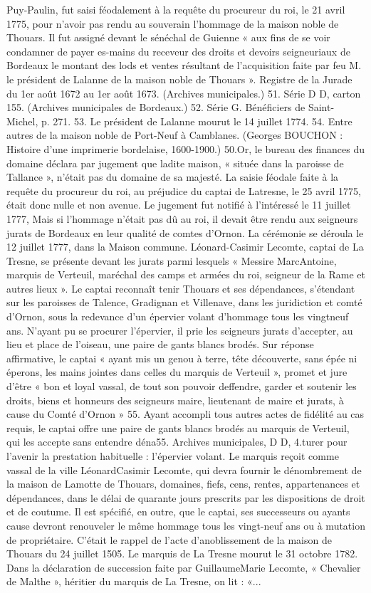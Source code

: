 Puy-Paulin, fut saisi féodalement à la requête du procureur du roi, le 21 avril 1775, pour n'avoir pas rendu au souverain l'hommage de la maison noble de Thouars. Il fut assigné devant le sénéchal de Guienne « aux fins de se voir condamner de payer es-mains du receveur des droits et devoirs seigneuriaux de Bordeaux le montant des lods et ventes résultant de l'acquisition faite par feu M. le président de Lalanne de la maison noble de Thouars ». Registre de la Jurade du 1er août 1672 au 1er août 1673. (Archives municipales.) 51. Série D D, carton 155. (Archives municipales de Bordeaux.) 52. Série G. Bénéficiers de Saint-Michel, p. 271. 53. Le président de Lalanne mourut le 14 juillet 1774. 54. Entre autres de la maison noble de Port-Neuf à Camblanes. (Georges BOUCHON : Histoire d'une imprimerie bordelaise, 1600-1900.) 50.Or, le bureau des finances du domaine déclara par jugement que ladite maison, « située dans la paroisse de Tallance », n'était pas du domaine de sa majesté. La saisie féodale faite à la requête du procureur du roi, au préjudice du captai de Latresne, le 25 avril 1775, était donc nulle et non avenue. Le jugement fut notifié à l'intéressé le 11 juillet 1777, Mais si l'hommage n'était pas dû au roi, il devait être rendu aux seigneurs jurats de Bordeaux en leur qualité de comtes d'Ornon. La cérémonie se déroula le 12 juillet 1777, dans la Maison commune. Léonard-Casimir Lecomte, captai de La Tresne, se présente devant les jurats parmi lesquels « Messire MarcAntoine, marquis de Verteuil, maréchal des camps et armées du roi, seigneur de la Rame et autres lieux ». Le captai reconnaît tenir Thouars et ses dépendances, s'étendant sur les paroisses de Talence, Gradignan et Villenave, dans les juridiction et comté d'Ornon, sous la redevance d'un épervier volant d'hommage tous les vingtneuf ans. N'ayant pu se procurer l'épervier, il prie les seigneurs jurats d'accepter, au lieu et place de l'oiseau, une paire de gants blancs brodés. Sur réponse affirmative, le captai « ayant mis un genou à terre, tête découverte, sans épée ni éperons, les mains jointes dans celles du marquis de Verteuil », promet et jure d'être « bon et loyal vassal, de tout son pouvoir deffendre, garder et soutenir les droits, biens et honneurs des seigneurs maire, lieutenant de maire et jurats, à cause du Comté d'Ornon » 55. Ayant accompli tous autres actes de fidélité au cas requis, le captai offre une paire de gants blancs brodés au marquis de Verteuil, qui les accepte sans entendre déna55. Archives municipales, D D, 4.turer pour l'avenir la prestation habituelle : l'épervier volant. Le marquis reçoit comme vassal de la ville LéonardCasimir Lecomte, qui devra fournir le dénombrement de la maison de Lamotte de Thouars, domaines, fiefs, cens, rentes, appartenances et dépendances, dans le délai de quarante jours prescrits par les dispositions de droit et de coutume. Il est spécifié, en outre, que le captai, ses successeurs ou ayants cause devront renouveler le même hommage tous les vingt-neuf ans ou à mutation de propriétaire. C'était le rappel de l'acte d'anoblissement de la maison de Thouars du 24 juillet 1505. Le marquis de La Tresne mourut le 31 octobre 1782. Dans la déclaration de succession faite par GuillaumeMarie Lecomte, « Chevalier de Malthe », héritier du marquis de La Tresne, on lit : «... 